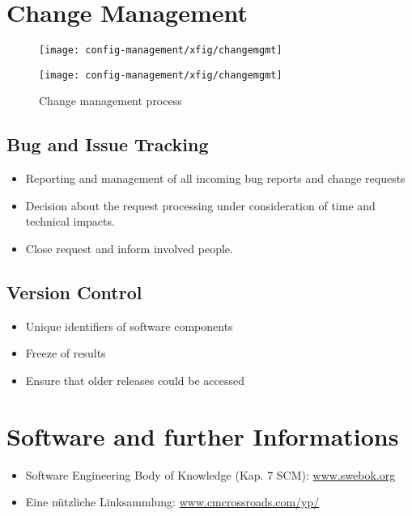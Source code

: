 \section{Change Management}
\begin{figure}[H]
\ifslides
\begin{center}
\texttt{[image: config-management/xfig/changemgmt]}\\[2ex]
\end{center}\else
\texttt{[image: config-management/xfig/changemgmt]}
\caption{Change management process}
\fi
\end{figure}
\begin{minipage}[t]{0.48\linewidth}
\subsection{Bug and Issue Tracking} %
\begin{itemize}
\item Reporting and management of all incoming bug reports and change requests
\item Decision about the request processing under consideration of
time and technical impacts.
\item Close request and inform involved people.
\end{itemize}
\end{minipage}
\hfill
\begin{minipage}[t]{0.48\linewidth}
\subsection{Version Control}
\begin{itemize}
\item Unique identifiers of software components
\item Freeze of results
\item Ensure that older releases could be accessed
\end{itemize}
\end{minipage}
\newslide
\section{Software and further Informations}
\begin{itemize}
\item Software Engineering Body of Knowledge (Kap. 7 SCM):
  \href{http://www.swebok.org}{www.swebok.org}
\item Eine nützliche  Linksammlung: \href{http://www.cmcrossroads.com/yp}
                                          {www.cmcrossroads.com/yp/}
\end{itemize}
\newslide
%
